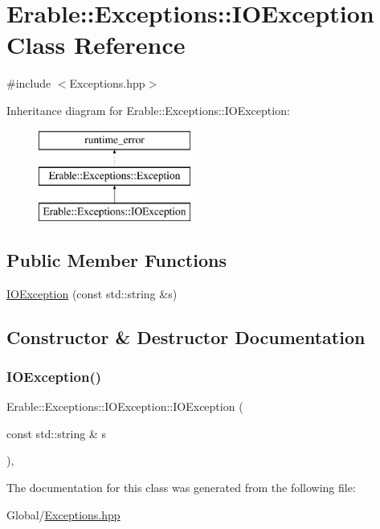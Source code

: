 \hypertarget{class_erable_1_1_exceptions_1_1_i_o_exception}{}\section{Erable\+::Exceptions\+::I\+O\+Exception Class Reference}
\label{class_erable_1_1_exceptions_1_1_i_o_exception}


{\ttfamily \#include $<$Exceptions.\+hpp$>$}

Inheritance diagram for Erable\+::Exceptions\+::I\+O\+Exception\+:\begin{figure}[H]
\begin{center}
\leavevmode
\includegraphics[height=3.000000cm]{class_erable_1_1_exceptions_1_1_i_o_exception}
\end{center}
\end{figure}
\subsection*{Public Member Functions}
\begin{DoxyCompactItemize}
\item 
\mbox{\hyperlink{class_erable_1_1_exceptions_1_1_i_o_exception_ab78834d3009e9e07c72b8af24c8ba21d}{I\+O\+Exception}} (const std\+::string \&s)
\end{DoxyCompactItemize}


\subsection{Constructor \& Destructor Documentation}
\mbox{\label{class_erable_1_1_exceptions_1_1_i_o_exception_ab78834d3009e9e07c72b8af24c8ba21d}} 
\subsubsection{\texorpdfstring{IOException()}{IOException()}}
{\footnotesize\ttfamily Erable\+::\+Exceptions\+::\+I\+O\+Exception\+::\+I\+O\+Exception (\begin{DoxyParamCaption}\item[{const std\+::string \&}]{s }\end{DoxyParamCaption})\hspace{0.3cm}{\ttfamily [inline]}, {\ttfamily [explicit]}}



The documentation for this class was generated from the following file\+:\begin{DoxyCompactItemize}
\item 
Global/\mbox{\hyperlink{_exceptions_8hpp}{Exceptions.\+hpp}}\end{DoxyCompactItemize}

